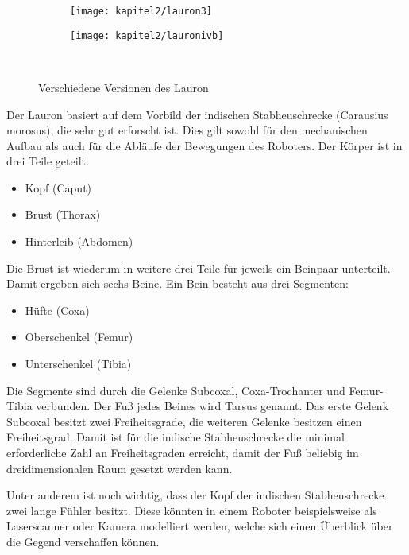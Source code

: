 \begin{figure}[t!]
  \centering
  \begin{subfigure}[b]{.4\linewidth}
    \centering
    \texttt{[image: kapitel2/lauron3]}
    \label{kap2:lauron3}
  \end{subfigure}%
  \qquad
  \begin{subfigure}[b]{.4\linewidth}
    \centering
    \texttt{[image: kapitel2/lauronivb]}
    \label{kap2:lauron4b}
  \end{subfigure}\\
  \caption{Verschiedene Versionen des Lauron}
  \label{kap2lauron}
\end{figure}

Der Lauron basiert auf dem Vorbild der indischen Stabheuschrecke (Carausius morosus), die sehr gut erforscht ist. Dies gilt sowohl für den mechanischen Aufbau als auch für die Abläufe der Bewegungen des Roboters. Der Körper ist in drei Teile geteilt.
\begin{itemize}
  \item Kopf (Caput)
  \item Brust (Thorax)
  \item Hinterleib (Abdomen)
\end{itemize}

Die Brust ist wiederum in weitere drei Teile für jeweils ein Beinpaar unterteilt. Damit ergeben sich sechs Beine. Ein Bein besteht aus drei Segmenten:
\begin{itemize}
  \item Hüfte (Coxa)
  \item Oberschenkel (Femur)
  \item Unterschenkel (Tibia)
\end{itemize}

Die Segmente sind durch die Gelenke Subcoxal, Coxa-Trochanter und Femur-Tibia verbunden. Der Fuß jedes Beines wird Tarsus genannt. Das erste Gelenk Subcoxal besitzt zwei Freiheitsgrade, die weiteren Gelenke besitzen einen Freiheitsgrad. Damit ist für die indische Stabheuschrecke die minimal erforderliche Zahl an Freiheitsgraden erreicht, damit der Fuß beliebig im dreidimensionalen Raum gesetzt werden kann.

Unter anderem ist noch wichtig, dass der Kopf der indischen Stabheuschrecke zwei lange Fühler besitzt. Diese könnten in einem Roboter beispielsweise als Laserscanner oder Kamera modelliert werden, welche sich einen Überblick über die Gegend verschaffen können.

